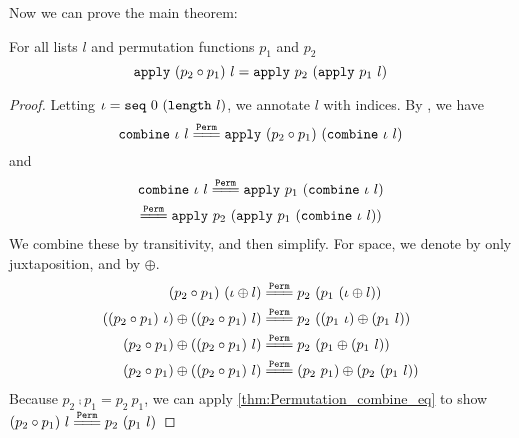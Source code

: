 \documentclass[sigplan,10pt,anonymous,review]{thesis}
\begin{document}
Now we can prove the main theorem:
\begin{theorem}
  For all lists $l$ and permutation functions $p_1$ and $p_2$
  \begin{equation*}
    \texttt{\textup{apply}}~(p_2 \circ p_1)~l = \texttt{\textup{apply}}~p_2~(\texttt{\textup{apply}}~p_1~l)
  \end{equation*}
\end{theorem}
\begin{proof}
  Letting $\iota = \texttt{\textup{seq}}~0~(\texttt{\textup{length}}~l)$, we annotate $l$ with
  indices. By , we have
  \begin{equation*}
    \var{combine}~\iota~l \eqperm \var{apply}~(p_2 \comp p_1)~(\var{combine}~\iota~l)
  \end{equation*}
  and
  \begin{gather*}
    \var{combine}~\iota~l
    \eqperm
    \var{apply}~p_1~(\var{combine}~\iota~l) \\
    \eqperm
    \var{apply}~p_2~(\var{apply}~p_1~(\var{combine}~\iota~l))
  \end{gather*}
  We combine these by transitivity, and then simplify. For space, we
  denote  by only juxtaposition, and  by $\oplus$.
  \begin{align*}
    (p_2 \comp p_1)~(\iota \oplus l)
    &\eqperm
    p_2~(p_1~(\iota \oplus l)) \\
    ((p_2 \comp p_1)~\iota) \oplus ((p_2 \comp p_1)~l)
    &\eqperm
    p_2~((p_1~\iota) \oplus (p_1~l)) \\
    (p_2 \comp p_1) \oplus ((p_2 \comp p_1)~l)
    &\eqperm
    p_2~(p_1 \oplus (p_1~l)) \\
    (p_2 \comp p_1) \oplus ((p_2 \comp p_1)~l)
    &\eqperm
    (p_2~p_1)\oplus(p_2~(p_1~l))
  \end{align*}
  Because $p_2 \comp p_1 = p_2~p_1$, we can apply
  \cref{thm:Permutation_combine_eq} to show $(p_2 \comp p_1)~l \eqperm
  p_2~(p_1~l)$
\end{proof}
\end{document}
